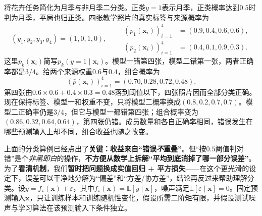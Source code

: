 \begin{example}[互补错误与共同错误]
  \label{ex:ket-integration-weighted-prediction}
  将花卉任务简化为月季与非月季二分类。正类$y=1$表示月季，正类概率达到$0.5$时判为月季，平局也归正类。四张教学照片的真实标签与来源概率为
  \[
    (y_1,y_2,y_3,y_4)=(1,0,1,0),\qquad
    \begin{aligned}
      (p_1(\bm{x}_i))_{i=1}^{4}&=(0.9,0.4,0.6,0.6),\\
      (p_2(\bm{x}_i))_{i=1}^{4}&=(0.4,0.1,0.9,0.3).
    \end{aligned}
  \]
  这里$p_k(\bm{x}_i)$简写$p_k(y=1\mid\bm{x}_i)$。模型一错第四张，模型二错第一张，两者正确率都是$3/4$。给两个来源权重$0.6$与$0.4$，组合概率为
  \[
    (\bar p(\bm{x}_i))_{i=1}^{4}
    =(0.70,0.28,0.72,0.48).
  \]
  第四张由$0.6\times0.6+0.4\times0.3=0.48$落到阈值以下，四张照片因而全部分类正确。现在保持标签、模型一和权重不变，只将模型二概率换成$(0.8,0.2,0.7,0.7)$。模型二正确率仍是$3/4$，但它与模型一都错第四张；组合概率变为$(0.86,0.32,0.64,0.64)$，第四张仍错。成员数量和各自正确率相同，错误发生在哪些预测输入上却不同，组合收益也随之改变。
\end{example}

上面的分类算例已经点出了\textbf{关键：收益来自“错误\emph{不}重叠”}。但“按$0.5$阈值判对错”是个\emph{非黑即白}的操作，\textbf{不方便从数学上拆解“平均到底消掉了哪一部分误差”}。为了\textbf{看清机制}，我们\textbf{暂时把问题换成实值回归 + 平方损失}——在这个更光滑的设定下，误差可以干净地分解为“偏差”和“方差/协方差”，结论再反过来帮助理解分类。设$y=f_\star(\bm{x})+\varepsilon$，其中$f_\star(\bm{x})=\mathbb{E}[y\mid\bm{x}]$，噪声满足$\mathbb{E}[\varepsilon\mid\bm{x}]=0$。固定预测输入$\bm{x}$，只让训练样本和训练随机性变化，假设所需二阶矩有限，并假设测试噪声与学习算法在该预测输入下条件独立。


